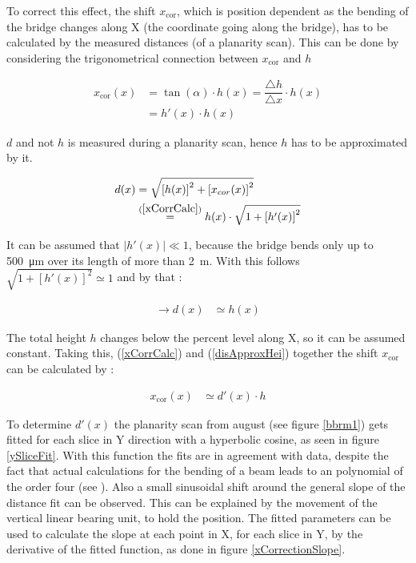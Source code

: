 \documentclass[
a4paper,                                %
twoside,                                %
BCOR1.4cm,                      %
10pt,                           %
headings=normal,                %
headsepline,                    %
clearplainpage, %
final,                                  %
div=14,
parskip=full,
openright,
bibliography=toc
]{scrreprt}
\begin{document}
To correct this effect, the shift $x_{\mathrm{cor}}$, which is position dependent as the bending of the bridge changes along X (the coordinate going along the bridge), has to be calculated by the measured distances (of a planarity scan). This can be done by considering the trigonometrical connection between $x_{\mathrm{cor}}$ and $h$ 

\begin{align}
	x_{\mathrm{cor}}(x) &= \tan\left(\alpha\right) \cdot h(x) = \dfrac{\bigtriangleup\!h}{\bigtriangleup\!x} \cdot h(x)
	\nonumber
	\\
	 &= h'(x) \cdot h(x)
	 \label{xCorrCalc}
\end{align}

$d$ and not $h$ is measured during a planarity scan, hence $h$ has to be approximated by it.

\begin{align}
	d(x) &= \sqrt{\left[h(x)\right]^{2} + \left[x_{cor}(x)\right]^{2}}
	\nonumber
	\\
	 &\stackrel{\mathrm{(\ref{xCorrCalc})}}= h(x) \cdot \sqrt{1 + \left[h'(x)\right]^{2}}
\end{align}

It can be assumed that $|h'(x)| \ll 1$, because the bridge bends only up to \SI{500}{\micro\m} over its length of more than \SI{2}{\m}. With this follows $ \sqrt{1 + \left[h'(x)\right]^{2}} \simeq 1$ and by that : 

\begin{align}
	\rightarrow d(x) &\simeq  h(x)
	\label{disApproxHei}
\end{align}

The total height $h$ changes below the percent level along X, so it can be assumed constant. Taking this, (\ref{xCorrCalc}) and (\ref{disApproxHei}) together the shift $x_{\mathrm{cor}}$ can be calculated by : 

\begin{align}
x_{\mathrm{cor}}(x) &\simeq d'(x) \cdot h
\end{align}

To determine $d'(x)$ the planarity scan from august (see figure \ref{bbrm1}) gets fitted for each slice in Y direction with a hyperbolic cosine, as seen in figure \ref{ySliceFit}. With this function the fits  are in agreement with data, despite the fact that actual calculations for the bending of a beam leads to an polynomial of the order four (see \cite{ansysBook}). Also a small sinusoidal shift around the general slope of the distance fit can be observed. This can be explained by the movement of the vertical linear bearing unit, to hold the position. The fitted parameters can be used to calculate the slope at each point in X, for each slice in Y, by the derivative of the fitted function, as done in figure \ref{xCorrectionSlope}. 
\end{document}
